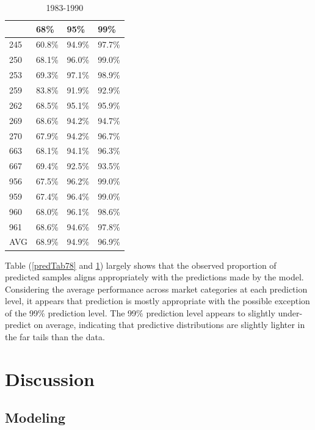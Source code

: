\documentclass[12pt]{article}
\begin{document}
\begin{table}[h!]
\centering
\begin{tabular}[c]{@{}llll@{}}
\hline
& 68\% & 95\% & 99\% \\ \hline
245 & 60.8\% & 94.9\% & 97.7\% \\  
250 & 68.1\% & 96.0\% & 99.0\% \\
253 & 69.3\% & 97.1\% & 98.9\% \\
259 & 83.8\% & 91.9\% & 92.9\% \\
262 & 68.5\% & 95.1\% & 95.9\% \\
269 & 68.6\% & 94.2\% & 94.7\% \\
270 & 67.9\% & 94.2\% & 96.7\% \\
663 & 68.1\% & 94.1\% & 96.3\% \\
667 & 69.4\% & 92.5\% & 93.5\% \\
956 & 67.5\% & 96.2\% & 99.0\% \\
959 & 67.4\% & 96.4\% & 99.0\% \\
960 & 68.0\% & 96.1\% & 98.6\% \\
961 & 68.6\% & 94.6\% & 97.8\% \\
AVG & 68.9\% & 94.9\% & 96.9\% \\ \hline
\end{tabular}
\caption{1983-1990}
\label{predTab83}
\end{table}

Table (\ref{predTab78} and \ref{predTab83}) largely shows that the observed 
proportion of predicted samples aligns appropriately with the predictions made 
by the model. Considering the average performance across market categories 
at each prediction level, it appears that prediction is mostly appropriate 
with the possible exception of the 99\% prediction level. The 99\% prediction 
level appears to slightly under-predict on average, indicating that predictive 
distributions are slightly lighter in the far tails than the data.

\section{Discussion}\label{discussion}

\subsection{Modeling}\label{modeling}
\end{document}
